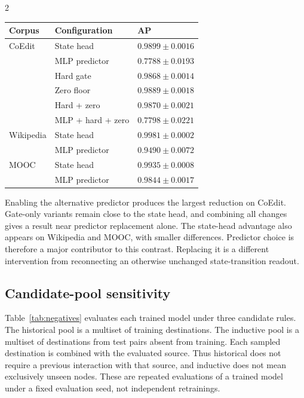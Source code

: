 \documentclass[a4paper,10pt,fleqn]{article}
\renewcommand{\small}{\fontsize{8}{12}\selectfont}
\begin{document}
\begin{multicols}{2}
\begin{center}
\begin{minipage}{\linewidth}\centering
{}\label{tab:knobs}
\small\setlength{\tabcolsep}{3pt}
\begin{tabular}{@{}lll@{}}
\toprule
Corpus & Configuration & AP\\ \midrule
CoEdit & State head & $0.9899\pm0.0016$\\
 & MLP predictor & $0.7788\pm0.0193$\\
 & Hard gate & $0.9868\pm0.0014$\\
 & Zero floor & $0.9889\pm0.0018$\\
 & Hard + zero & $0.9870\pm0.0021$\\
 & MLP + hard + zero & $0.7798\pm0.0221$\\
Wikipedia & State head & $0.9981\pm0.0002$\\
 & MLP predictor & $0.9490\pm0.0072$\\
MOOC & State head & $0.9935\pm0.0008$\\
 & MLP predictor & $0.9844\pm0.0017$\\
\bottomrule
\end{tabular}
\end{minipage}
\end{center}

Enabling the alternative predictor produces the largest reduction on CoEdit. Gate-only variants remain close to the state head, and combining all changes gives a result near predictor replacement alone. The state-head advantage also appears on Wikipedia and MOOC, with smaller differences. Predictor choice is therefore a major contributor to this contrast. Replacing it is a different intervention from reconnecting an otherwise unchanged state-transition readout.

\subsection{Candidate-pool sensitivity}
Table~\ref{tab:negatives} evaluates each trained model under three candidate rules. The historical pool is a multiset of training destinations. The inductive pool is a multiset of destinations from test pairs absent from training. Each sampled destination is combined with the evaluated source. Thus historical does not require a previous interaction with that source, and inductive does not mean exclusively unseen nodes. These are repeated evaluations of a trained model under a fixed evaluation seed, not independent retrainings.


\end{multicols}
\end{document}
